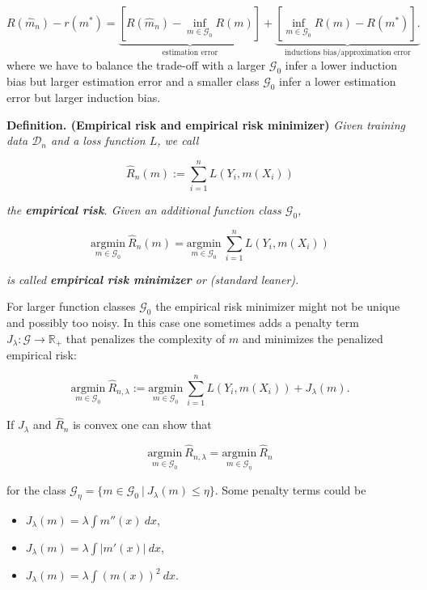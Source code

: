 \documentclass[a4paper,12pt,openany]{book}
\providecommand{\tightlist}{%
 \setlength{\itemsep}{0pt}\setlength{\parskip}{0pt}}
\begin{document}
\[
R(\hat{m}_n)-r(m^*)=\underbrace{\left[R(\hat{m}_n)-\inf_{m\in\mathcal{G}_0}R(m)\right]}_{\text{estimation error}}+\underbrace{\left[\inf_{m\in\mathcal{G}_0}R(m)-R(m^*)\right].}_{\text{inductions bias/approximation error}}
\]
where we have to balance the trade-off with a larger \(\mathcal{G}_0\) infer a lower induction bias but larger estimation error and a smaller class \(\mathcal{G}_0\) infer a lower estimation error but larger induction bias.

\textbf{Definition. (Empirical risk and empirical risk minimizer)} \emph{Given training data \(\mathcal{D}_n\) and a loss function \(L\), we call}

\[
\hat{R}_n(m):=\sum_{i=1}^nL(Y_i,m(X_i))
\]

\emph{the \textbf{empirical risk}. Given an additional function class \(\mathcal{G}_0\),}

\[
\underset{m\in\mathcal{G}_0}{\text{argmin}}\ \hat{R}_n(m)=\underset{m\in\mathcal{G}_0}{\text{argmin}}\ \sum_{i=1}^nL(Y_i,m(X_i))
\]

\emph{is called \textbf{empirical risk minimizer} or (standard leaner).}

For larger function classes \(\mathcal{G}_0\) the empirical risk minimizer might not be unique and possibly too noisy. In this case one sometimes adds a penalty term \(J_\lambda : \mathcal{G}\to \mathbb{R}_+\) that penalizes the complexity of \(m\) and minimizes the penalized empirical risk:

\[
\underset{m\in\mathcal{G}_0}{\text{argmin}}\ \hat{R}_{n,\lambda}:=\underset{m\in\mathcal{G}_0}{\text{argmin}}\ \sum_{i=1}^nL(Y_i,m(X_i)) + J_\lambda(m).
\]

If \(J_\lambda\) and \(\hat{R}_n\) is convex one can show that

\[
\underset{m\in\mathcal{G}_0}{\text{argmin}}\ \hat{R}_{n,\lambda}=\underset{m\in\mathcal{G}_\eta}{\text{argmin}}\ \hat{R}_{n}
\]

for the class \(\mathcal{G}_\eta=\{m\in \mathcal{G}_0\ \vert\ J_\lambda(m)\le \eta\}\). Some penalty terms could be

\begin{itemize}
\tightlist
\item
  \(J_\lambda(m)=\lambda\int m''(x)\ dx\),
\item
  \(J_\lambda(m)=\lambda \int\vert m'(x)\vert\ dx\),
\item
  \(J_\lambda(m)=\lambda \int(m(x))^2\ dx\).
\end{itemize}
\end{document}
